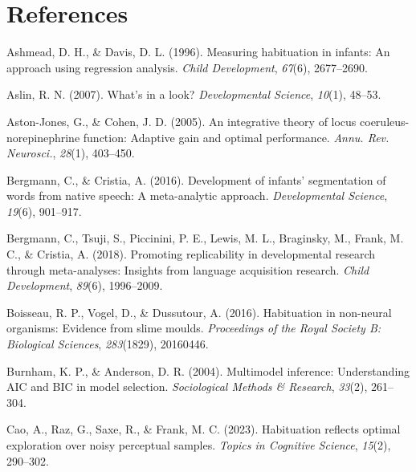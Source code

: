 \documentclass[10pt, letterpaper]{article}
\newenvironment{CSLReferences}%
  {}%
  {\par}
\begin{document}
\hypertarget{references}{%
\section{References}\label{references}}

\setlength{\parindent}{-0.1in} 
\setlength{\leftskip}{0.125in}

\noindent

\hypertarget{refs}{}
\begin{CSLReferences}{1}{0}
\leavevmode{}%
Ashmead, D. H., \& Davis, D. L. (1996). Measuring habituation in
infants: An approach using regression analysis. \emph{Child
Development}, \emph{67}(6), 2677--2690.

\leavevmode{}%
Aslin, R. N. (2007). What's in a look? \emph{Developmental Science},
\emph{10}(1), 48--53.

\leavevmode{}%
Aston-Jones, G., \& Cohen, J. D. (2005). An integrative theory of locus
coeruleus-norepinephrine function: Adaptive gain and optimal
performance. \emph{Annu. Rev. Neurosci.}, \emph{28}(1), 403--450.

\leavevmode{}%
Bergmann, C., \& Cristia, A. (2016). Development of infants'
segmentation of words from native speech: A meta-analytic approach.
\emph{Developmental Science}, \emph{19}(6), 901--917.

\leavevmode{}%
Bergmann, C., Tsuji, S., Piccinini, P. E., Lewis, M. L., Braginsky, M.,
Frank, M. C., \& Cristia, A. (2018). Promoting replicability in
developmental research through meta-analyses: Insights from language
acquisition research. \emph{Child Development}, \emph{89}(6),
1996--2009.

\leavevmode{}%
Boisseau, R. P., Vogel, D., \& Dussutour, A. (2016). Habituation in
non-neural organisms: Evidence from slime moulds. \emph{Proceedings of
the Royal Society B: Biological Sciences}, \emph{283}(1829), 20160446.

\leavevmode{}%
Burnham, K. P., \& Anderson, D. R. (2004). Multimodel inference:
Understanding AIC and BIC in model selection. \emph{Sociological Methods
\& Research}, \emph{33}(2), 261--304.

\leavevmode{}%
Cao, A., Raz, G., Saxe, R., \& Frank, M. C. (2023). Habituation reflects
optimal exploration over noisy perceptual samples. \emph{Topics in
Cognitive Science}, \emph{15}(2), 290--302.


\end{CSLReferences}
\end{document}
